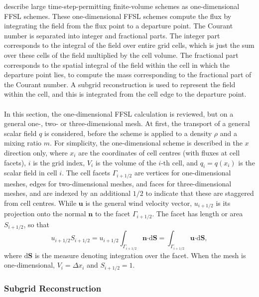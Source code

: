\documentclass{ametsocV6.1}
\begin{document}
\citet{lin1996ffsl} describe large time-step-permitting finite-volume schemes as one-dimensional FFSL schemes. These one-dimensional FFSL schemes compute the flux by integrating the field from the flux point to a departure point. The Courant number is separated into integer and fractional parts. The integer part corresponds to the integral of the field over entire grid cells, which is just the sum over these cells of the field multiplied by the cell volume. The fractional part corresponds to the spatial integral of the field within the cell in which the departure point lies, to compute the mass corresponding to the fractional part of the Courant number. A subgrid reconstruction is used to represent the field within the cell, and this is integrated from the cell edge to the departure point. \\
\\
In this section, the one-dimensional FFSL calculation is reviewed, but on a general one-, two- or three-dimensional mesh.
At first, the transport of a general scalar field $q$ is considered, before the scheme is applied to a density $\rho$ and a mixing ratio $m$.
For simplicity, the one-dimensional scheme is described in the $x$ direction only, where $x_i$ are the coordinates of cell centres (with fluxes at cell facets), $i$ is the grid index, $V_i$ is the volume of the $i$-th cell, and $q_i=q(x_i)$ is the scalar field in cell $i$.
The cell facets $\varGamma_{i+1/2}$ are vertices for one-dimensional meshes, edges for two-dimensional meshes, and faces for three-dimensional meshes, and are indexed by an additional $1/2$ to indicate that these are staggered from cell centres.
While $\bm{u}$ is the general wind velocity vector, $u_{i+1/2}$ is its projection onto the normal $\bm{n}$ to the facet $\varGamma_{i+1/2}$.
The facet has length or area $S_{i+1/2}$, so that
\begin{equation} \label{eqn:u_normal}
u_{i+1/2} S_{i+1/2} =
u_{i+1/2} \int_{\varGamma_{i+1/2}} \bm{n} \bm{\cdot} \mathrm{d}\bm{S} = \int_{\varGamma_{i+1/2}} \bm{u} \bm{\cdot} \mathrm{d}\bm{S},
\end{equation}
where $\mathrm{d}\bm{S}$ is the measure denoting integration over the facet.
When the mesh is one-dimensional, $V_i=\Delta x_i$ and $S_{i+1/2}=1$.

\subsubsection{Subgrid Reconstruction}
\end{document}
